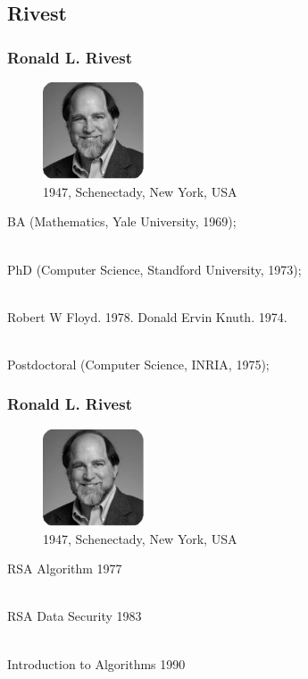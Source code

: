 \documentclass[slidestop,compress,mathserif]{beamer}
\begin{document}
\subsection{\hfill Rivest}
\begin{frame}
  \frametitle{Ronald L. Rivest}
  \begin{multicols}{2}
    \begin{figure}
      \includegraphics[width=3cm]{r.png}
      \caption{1947, Schenectady, New York, USA}
    \end{figure}


   BA (Mathematics, Yale University, 1969);

   ~\\

   PhD (Computer Science, Standford University, 1973); 

   ~\\

   Robert W Floyd. 1978. 
   Donald Ervin Knuth. 1974. 

~\\

   Postdoctoral (Computer Science, INRIA, 1975);

    
  \end{multicols}
  
\end{frame}

\begin{frame}
  \frametitle{Ronald L. Rivest}
  \begin{multicols}{2}
    \begin{figure}
      \includegraphics[width=3cm]{r.png}
      \caption{1947, Schenectady, New York, USA}
    \end{figure}

   RSA Algorithm 1977

   ~\\

   RSA Data Security  1983

   ~\\

   Introduction to Algorithms 1990

    
  \end{multicols}
  
\end{frame}
\end{document}
